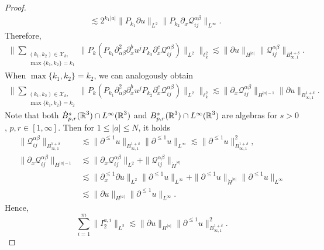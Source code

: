 \documentclass[10pt,a4paper]{amsart}
\def\R{\mathop{\mathbb R\kern 0pt}\nolimits}
\def\cQ{\mathcal Q}
\def\ls{\lesssim}
\def\p{\partial}
\begin{document}
\begin{proof}
\begin{equation*}
\begin{aligned}
			&\lesssim 2^{k_1|a|} \|P_{k_1} \partial u\|_{L^2} \|P_{k_2} \p_x \cQ^{\alpha\beta}_{ij}\|_{L^\infty}.
		\end{aligned}	
	\end{equation*}
	Therefore,
	\begin{equation*}
		\begin{aligned}
			\big\| \sum_{\substack{(k_1,k_2) \in \mathcal{X}_k, \\ \max\{k_1,k_2\}=k_1}} \| P_k(P_{k_1} \partial_{\alpha\beta}^2 \partial_x^b u^j P_{k_2} \p_x^c\cQ^{\alpha\beta}_{ij} )\|_{L^2}\big\|_{\ell_k^2}
			\lesssim \|\partial u\|_{H^{|a|}}  \| \cQ^{\alpha\beta}_{ij} \|_{B^{1+\delta}_{\infty,1}}.
		\end{aligned}
	\end{equation*}
	When $\max\{k_1, k_2\} = k_2$, we can analogously obtain
	\begin{equation}\label{3.11}
	\begin{aligned}
	\big\| \sum_{\substack{(k_1,k_2) \in \mathcal{X}_k, \\ \max\{k_1,k_2\}=k_2}} \|P_k(P_{k_1} \partial_{\alpha\beta}^2 \partial_x^b u^j P_{k_2} \p_x^c\cQ^{\alpha\beta}_{ij} )\|_{L^2}\big\|_{\ell_k^2}
	\lesssim \|\p_x\cQ^{\alpha\beta}_{ij} \|_{H^{|a|-1}} \| \partial u\|_{B^{1+\delta}_{\infty,1}} .
	\end{aligned}	
	\end{equation}
Note that both $\dot{B}^s_{p,r}(\R^3)\cap L^\infty(\R^3)$ and $B^s_{p,r}(\R^3)\cap L^\infty(\R^3)$ are algebras for $s > 0$, $p,r\in[1,\infty]$.
Then for $1\le |a|\le N$, it holds
\begin{equation*}
\begin{split}
\| \cQ^{\alpha\beta}_{ij} \|_{B^{1+\delta}_{\infty,1}}&\ls \| \p^{\le 1} u \|_{B^{1+\delta}_{\infty,1}}\| \p^{\le 1} u \|_{L^{\infty}}\ls \| \p^{\le 1} u \|_{B^{1+\delta}_{\infty,1}}^2,\\
\|\p_x\cQ^{\alpha\beta}_{ij} \|_{H^{|a|-1}}&\ls\|\p_x\cQ^{\alpha\beta}_{ij} \|_{L^{2}} +\|\cQ^{\alpha\beta}_{ij} \|_{\dot{H}^{|a|}}\\
&\ls\|\partial_x^{\le 1}\partial  u\|_{L^2}\|\partial^{\le 1}  u\|_{L^\infty}
+\|\partial^{\le 1}  u\|_{\dot{H}^{|a|}} \|\partial^{\le 1}  u\|_{L^\infty}\\
&\ls\|\partial u\|_{{H}^{|a|}} \|\partial^{\le 1}  u\|_{L^\infty}.
\end{split}
\end{equation*}
Hence,
\begin{equation*}
\sum_{i=1}^{m}\|I_2^{a,i}\|_{L^2}\ls \|\partial u\|_{H^{|a|}} \|\partial^{\le1} u\|_{B^{1+\delta}_{\infty,1}}^2.

\end{equation*}
\end{proof}
\end{document}
